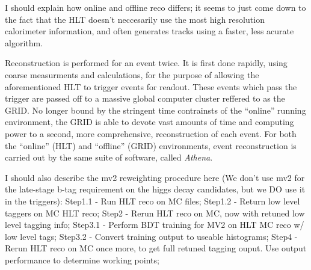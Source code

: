         I should explain how online and offline reco differs;
            it seems to just come down to the fact that the HLT doesn't neccesarily use the most high resolution calorimeter information,
            and often generates tracks using a faster, less acurate algorithm.

        Reconstruction is performed for an event twice.
        It is first done rapidly, using coarse measurments and calculations,
            for the purpose of allowing the aforementioned HLT to trigger events for readout.
        These events which pass the trigger are passed off to a massive global computer cluster reffered to as the GRID.
        No longer bound by the stringent time contrainsts of the ``online'' running environment,
            the GRID is able to devote vast amounts of time and computing power to a second, 
            more comprehensive, reconstruction of each event.
        For both the ``online'' (HLT) and ``offline'' (GRID) environments, event reconstruction is carried out by the same suite of software,
            called \textit{Athena}.

            
        I should also describe the mv2 reweighting procedure here
            (We don't use mv2 for the late-stage b-tag requirement on the higgs decay candidates,
            but we DO use it in the triggers):
            Step1.1 - Run HLT reco on MC files;
            Step1.2 - Return low level taggers on MC HLT reco;
            Step2   - Rerun HLT reco on MC, now with retuned low level tagging info;
            Step3.1 - Perform BDT training for MV2 on HLT MC reco w/ low level tags;
            Step3.2 - Convert training output to useable histograms;
            Step4   - Rerun HLT reco on MC once more, to get full retuned tagging ouput. Use output performance to determine working points;

